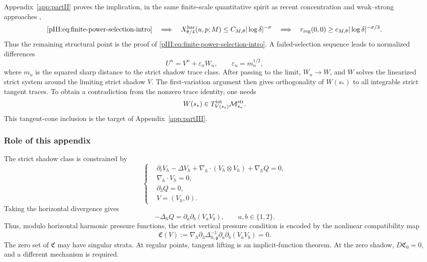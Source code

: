 \documentclass[11pt]{article}
\numberwithin{equation}{section}
\theoremstyle{plain}
\theoremstyle{definition}
\theoremstyle{remark}
\newcommand{\eps}{\varepsilon}
\newcommand{\nabh}{\nabla_h}
\newcommand{\divh}{\nabla_h\!\cdot}
\newcommand{\Mstr}{\mathcal M^{\rm str}}
\newcommand{\Tint}{T^{\rm int}}
\newcommand{\calC}{\mathfrak C}
\begin{document}
Appendix~\ref{app:partII} proves the implication, in the same finite-scale quantitative spirit as recent concentration and weak--strong approaches \cite{BarkerPrange2021,AlbrittonBarkerPrange2023},
\begin{equation}\label{pIII:eq:partII-chain}
        \eqref{pIII:eq:finite-power-selection-intro}
        \quad\Longrightarrow\quad
        X^{\rm har}_{\theta/4}(u,p;M)
        \le C_{M,\theta}|\log\delta|^{-\sigma}
        \quad\Longrightarrow\quad
        r_{\rm reg}(0,0)
        \ge c_{M,\theta}|\log\delta|^{-\sigma/3}.
\end{equation}
Thus the remaining structural point is the proof of \eqref{pIII:eq:finite-power-selection-intro}.  A
failed-selection sequence leads to normalized differences
\[
        U^n=V^n+\eps_n W_n,
        \qquad
        \eps_n=m_n^{1/2},
\]
where \(m_n\) is the squared sharp distance to the strict shadow trace class.  After
passing to the limit, \(W_n\to W\), and \(W\) solves the linearized strict system around
the limiting strict shadow \(V\).  The first-variation argument then gives orthogonality
of \(W(s_*)\) to all integrable strict tangent traces.  To obtain a contradiction from
the nonzero trace identity, one needs
\begin{equation}\label{pIII:eq:tangent-cone-needed-intro}
        W(s_*)\in \Tint_{V(s_*)}\Mstr_{s_*}.
\end{equation}
This tangent-cone inclusion is the target of Appendix~\ref{app:partIII}.

\subsubsection*{Role of this appendix}

The strict shadow class is constrained by
\begin{equation}\label{pIII:eq:strict-system-intro}
\left\{
\begin{aligned}
        &\partial_tV_h-\Delta V_h+
        \nabh\cdot(V_h\otimes V_h)+\nabh Q=0,\\
        &\divh V_h=0,\\
        &\partial_3Q=0,\\
        &V=(V_h,0).
\end{aligned}
\right.
\end{equation}
Taking the horizontal divergence gives
\[
        -\Delta_h Q=\partial_a\partial_b(V_aV_b),
        \qquad a,b\in\{1,2\}.
\]
Thus, modulo horizontal harmonic pressure functions, the strict vertical pressure
condition is encoded by the nonlinear compatibility map
\begin{equation}\label{pIII:eq:C-map-intro}
        \calC(V)
        :=
        \nabh\partial_3\Delta_{h,\mathfrak g}^{-1}
        \partial_a\partial_b(V_aV_b)=0.
\end{equation}
The zero set of \(\calC\) may have singular strata.  At regular points, tangent lifting
is an implicit-function theorem.  At the zero shadow, \(D\calC_0=0\), and a different
mechanism is required.
\end{document}
